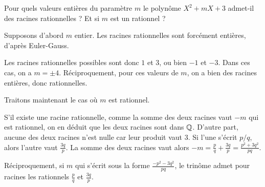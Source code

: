 

\begin{exo}%

Pour quels valeurs entières du paramètre $m$ le polynôme $X^2+mX+3$ admet-il des racines rationnelles ? Et si $m$ est un rationnel ?
\begin{sol}
Supposons d'abord $m$ entier. Les racines rationnelles sont forcément entières, d'après Euler-Gauss.

Les racines rationnelles possibles sont donc $1$ et $3$, ou bien $-1$ et $-3$. Dans ces cas, on a $m=\pm 4$. Réciproquement, pour ces valeurs de $m$, on a bien des racines entières, donc rationnelles.

Traitons maintenant le cas où $m$ est rationnel.

S'il existe une racine rationnelle, comme la somme des deux racines vaut $-m$ qui est rationnel, on en déduit que les deux racines sont dans $\mathbb Q$. D'autre part, aucune des deux racines n'est nulle car leur produit vaut $3$. Si l'une s'écrit $p/q$, alors l'autre vaut $\frac{3q}{p}$. La somme des deux racines vaut alors $-m=\frac{p}{q} + \frac{3q}{p} = \frac{p^2+3q^2}{pq}$.

Réciproquement, si $m$ qui s'écrit sous la forme $\frac{-p^2-3q^2}{pq}$, le trinôme admet pour racines les rationnels $\frac{p}{q}$ et $\frac{3q}{p}$.
\end{sol}
\end{exo}

